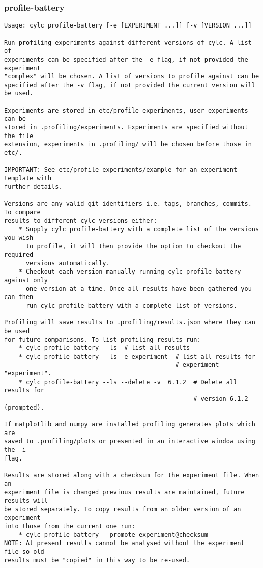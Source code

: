 \subsubsection{profile-battery}
\label{profile-battery}
\begin{lstlisting}
Usage: cylc profile-battery [-e [EXPERIMENT ...]] [-v [VERSION ...]]

Run profiling experiments against different versions of cylc. A list of
experiments can be specified after the -e flag, if not provided the experiment
"complex" will be chosen. A list of versions to profile against can be
specified after the -v flag, if not provided the current version will be used.

Experiments are stored in etc/profile-experiments, user experiments can be
stored in .profiling/experiments. Experiments are specified without the file
extension, experiments in .profiling/ will be chosen before those in etc/.

IMPORTANT: See etc/profile-experiments/example for an experiment template with
further details.

Versions are any valid git identifiers i.e. tags, branches, commits. To compare
results to different cylc versions either:
    * Supply cylc profile-battery with a complete list of the versions you wish
      to profile, it will then provide the option to checkout the required
      versions automatically.
    * Checkout each version manually running cylc profile-battery against only
      one version at a time. Once all results have been gathered you can then
      run cylc profile-battery with a complete list of versions.

Profiling will save results to .profiling/results.json where they can be used
for future comparisons. To list profiling results run:
    * cylc profile-battery --ls  # list all results
    * cylc profile-battery --ls -e experiment  # list all results for
                                               # experiment "experiment".
    * cylc profile-battery --ls --delete -v  6.1.2  # Delete all results for
                                                    # version 6.1.2 (prompted).

If matplotlib and numpy are installed profiling generates plots which are
saved to .profiling/plots or presented in an interactive window using the -i
flag.

Results are stored along with a checksum for the experiment file. When an
experiment file is changed previous results are maintained, future results will
be stored separately. To copy results from an older version of an experiment
into those from the current one run:
    * cylc profile-battery --promote experiment@checksum
NOTE: At present results cannot be analysed without the experiment file so old
results must be "copied" in this way to be re-used.


\end{lstlisting}
